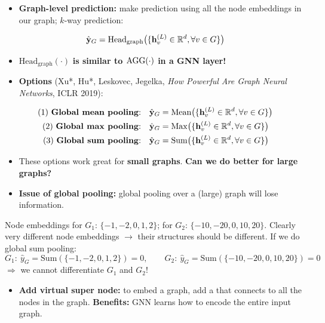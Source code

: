 \begin{itemize}
  \item \textbf{Graph-level prediction:} make prediction using all the node
    embeddings in our graph; $k$-way prediction:
\end{itemize}
\begin{equation}\label{eq:lec05-headgraph}
  \hat{\mathbf{y}}_G = \mathrm{Head}_{\mathrm{graph}}\big(\{\mathbf{h}_v^{(L)}\in\mathbb{R}^d,
  \forall v\in G\}\big)
\end{equation}
\begin{itemize}
  \item $\mathrm{Head}_{\mathrm{graph}}(\cdot)$ \textbf{is similar to
    $\operatorname{AGG}(\cdot)$ in a GNN layer!}
  \item \textbf{Options} (Xu*, Hu*, Leskovec, Jegelka, \emph{How Powerful Are
    Graph Neural Networks}, ICLR 2019):
\end{itemize}
\begin{align}
  \text{(1) \textbf{Global mean pooling}:}\quad
    & \hat{\mathbf{y}}_G = \mathrm{Mean}\big(\{\mathbf{h}_v^{(L)}\in\mathbb{R}^d,\forall v\in G\}\big)
    \label{eq:lec05-mean}\\
  \text{(2) \textbf{Global max pooling}:}\quad
    & \hat{\mathbf{y}}_G = \mathrm{Max}\big(\{\mathbf{h}_v^{(L)}\in\mathbb{R}^d,\forall v\in G\}\big)
    \label{eq:lec05-max}\\
  \text{(3) \textbf{Global sum pooling}:}\quad
    & \hat{\mathbf{y}}_G = \mathrm{Sum}\big(\{\mathbf{h}_v^{(L)}\in\mathbb{R}^d,\forall v\in G\}\big)
    \label{eq:lec05-sum}
\end{align}
\begin{itemize}
  \item These options work great for \textbf{small graphs}. \textbf{Can we do
    better for large graphs?}
  \item \textbf{Issue of global pooling:} global pooling over a (large) graph
    will lose information.
\end{itemize}
\begin{example}
  Node embeddings for $G_1$: $\{-1,-2,0,1,2\}$; for $G_2$:
  $\{-10,-20,0,10,20\}$. Clearly very different node embeddings $\to$ their
  structures should be different. If we do global sum pooling:
  \[
    G_1:\ \hat{y}_G = \mathrm{Sum}(\{-1,-2,0,1,2\}) = 0,\qquad
    G_2:\ \hat{y}_G = \mathrm{Sum}(\{-10,-20,0,10,20\}) = 0
  \]
  $\Rightarrow$ we cannot differentiate $G_1$ and $G_2$!
\end{example}
\begin{itemize}
  \item \textbf{Add virtual super node:} to embed a graph, add a
     that connects to all the nodes in the graph.
    \textbf{Benefits:} GNN learns how to encode the entire input graph.
\end{itemize}

